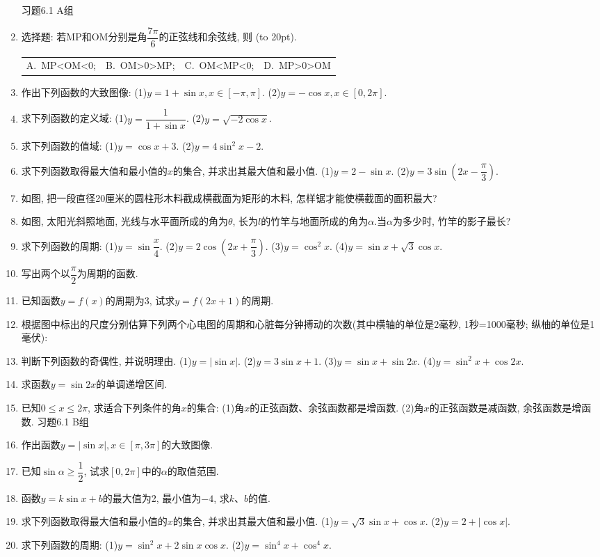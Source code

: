 \documentclass[10pt,a4paper]{article}
\newcommand{\bracket}[1]{(\hbox to #1pt{})}
\newcommand{\fourch}[4]{\par\begin{tabular}{p{.23\textwidth}p{.23\textwidth}p{.23\textwidth}p{.23\textwidth}}
A.~#1 &B.~#2& C.~#3& D.~#4
\end{tabular}}
\begin{document}
\begin{enumerate}[1.]
习题6.1  A组
\item 选择题:
若MP和OM分别是角$\dfrac{7\pi }6$的正弦线和余弦线, 则						\bracket{20}.
\fourch{MP<OM<0;}{OM>0>MP;}{OM<MP<0;}{MP>0>OM}
\item 作出下列函数的大致图像:
(1)$y=1+\sin x,x\in [-\pi ,\pi]$.				(2)$y=-\cos x,x\in [0,2\pi]$.
\item 求下列函数的定义域:
(1)$y=\dfrac 1{1+\sin x}$.						(2)$y=\sqrt {-2\cos x}$.
\item 求下列函数的值域:
(1)$y=\cos x+3$.						(2)$y=4\sin ^2x-2$.
\item 求下列函数取得最大值和最小值的$x$的集合, 并求出其最大值和最小值.
(1)$y=2-\sin x$.						(2)$y=3\sin (2x-\dfrac{\pi }3)$.
\item 如图, 把一段直径20厘米的圆柱形木料截成横截面为矩形的木料, 怎样锯才能使横截面的面积最大?
\item 如图, 太阳光斜照地面, 光线与水平面所成的角为$\theta$, 长为$l$的竹竿与地面所成的角为$\alpha$.当$\alpha$为多少时, 竹竿的影子最长?
\item 求下列函数的周期:
(1)$y=\sin \dfrac x4$.						(2)$y=2\cos (2x+\dfrac{\pi }3)$.
(3)$y=\cos ^2x$.						(4)$y=\sin x+\sqrt 3\cos x$.
\item 写出两个以$\dfrac{\pi }2$为周期的函数.
\item 已知函数$y=f(x)$的周期为3, 试求$y=f(2x+1)$的周期.
\item 根据图中标出的尺度分别估算下列两个心电图的周期和心脏每分钟搏动的次数(其中横轴的单位是2毫秒, 1秒=1000毫秒; 纵柚的单位是1毫伏):
\item 判断下列函数的奇偶性, 并说明理由.
(1)$y=|\sin x|$.							(2)$y=3\sin x+1$.
(3)$y=\sin x+\sin 2x$.					(4)$y=\sin ^2x+\cos 2x$.
\item 求函数$y=\sin 2x$的单调递增区间.
\item 已知$0\le x\le 2\pi$, 求适合下列条件的角$x$的集合:
(1)角$x$的正弦函数、余弦函数都是增函数.
(2)角$x$的正弦函数是减函数, 余弦函数是增函数.
习题6.1  B组
\item 作出函数$y=|\sin x|,x\in [\pi ,3\pi]$的大致图像.
\item 已知$\sin \alpha \ge \dfrac 12$, 试求$[0,2\pi]$中的$\alpha$的取值范围.
\item 函数$y=k\sin x+b$的最大值为2, 最小值为$-4$, 求$k$、$b$的值.
\item 求下列函数取得最大值和最小值的$x$的集合, 并求出其最大值和最小值.
(1)$y=\sqrt 3\sin x+\cos x$.					(2)$y=2+|\cos x|$.
\item 求下列函数的周期:
(1)$y=\sin ^2x+2\sin x\cos x$.				(2)$y=\sin ^4x+\cos ^4x$.

\end{enumerate}
\end{document}
